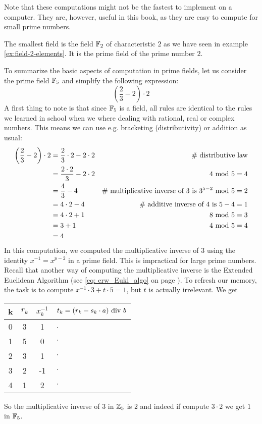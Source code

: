 Note that these computations might not be the fastest to implement on a computer. They are, however, useful in this book, as they are easy to compute for small prime numbers.
\begin{example}
The smallest field is the field $\mathbb{F}_2$ of characteristic $2$ as we have seen in example \ref{ex:field-2-elements}. It is the prime field of the prime number $2$.
\end{example}
\begin{example}\label{ex:prime-field}
To summarize the basic aspects of computation in prime fields, let us consider the prime field $\mathbb{F}_5$ and simplify the following expression:
$$\left(\frac{2}{3} - 2\right)\cdot 2 $$
A first thing to note is that since $\mathbb{F}_5$ is a field, all rules are identical to the rules we learned in school when we where dealing with rational, real or complex numbers. This means we can use e.g.  bracketing (distributivity) or addition as usual:
\begin{align*}
\left(\frac{2}{3} - 2\right)\cdot 2 &=
 \frac{2}{3}\cdot 2 - 2\cdot 2 & \text{\# distributive law}\\
 &= \frac{2\cdot 2}{3} - 2\cdot 2 & 4 \text{ mod } 5=4 \\
 &= \frac{4}{3} - 4 & \text{\# multiplicative inverse of 3 is } 3^{5-2} \text{ mod } 5=2\\
 &= 4\cdot 2 - 4 & \text{\# additive inverse of 4 is } 5-4=1\\
 &= 4\cdot 2 +1 & 8 \text{ mod } 5=3\\
 &= 3 +1 & 4 \text{ mod } 5=4\\
 &= 4
\end{align*}
In this computation, we computed the multiplicative inverse of $3$ using the identity
$x^{-1}=x^{p-2}$ in a prime field. This is impractical for large prime numbers. Recall that another way of computing the multiplicative inverse is the Extended Euclidean Algorithm (see \ref{eq: erw_Eukl_algo} on page \pageref{eq: erw_Eukl_algo}).  To refresh our memory, the task is to compute $x^{-1}\cdot 3 + t \cdot 5 =1$, but $t$ is actually irrelevant. We get
\begin{center}
  \begin{tabular}{c | c c l}
    k & $ r_k $ & $ x^{-1}_k $ & $ t_k = (r_k-s_k \cdot a) \text{ div } b $ \\\hline
    0 & 3 & 1 & $\cdot$\ \\
    1 & 5 & 0 & $\cdot$ \\
    2 & 3 & 1 & $\cdot$ \\
    3 & 2 &-1 & $\cdot$ \\
    4 & 1 & 2  & $\cdot$ \\
  \end{tabular}
\end{center}
So the multiplicative inverse of $3$ in $\mathbb{Z}_5$ is $2$ and indeed if compute $3\cdot 2$ we get $1$ in $\mathbb{F}_5$.
\end{example}
